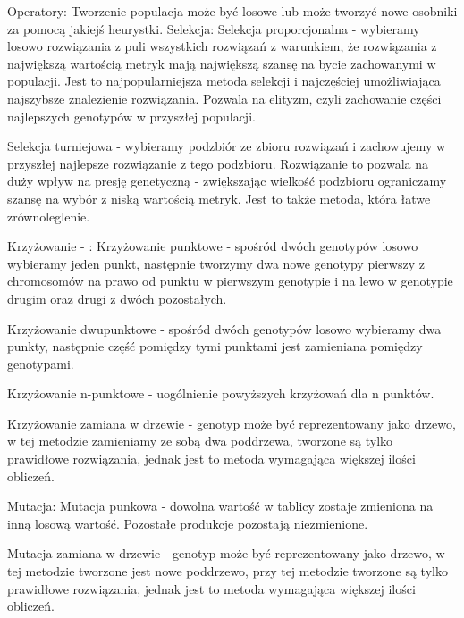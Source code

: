 Operatory:
Tworzenie populacja może być losowe lub może tworzyć nowe osobniki za pomocą jakiejś heurystki. 
Selekcja:
Selekcja proporcjonalna - wybieramy losowo rozwiązania z puli wszystkich rozwiązań z warunkiem, że rozwiązania z największą wartością metryk mają największą szansę na bycie zachowanymi w populacji. Jest to najpopularniejsza metoda selekcji i najczęściej umożliwiająca najszybsze znalezienie rozwiązania. Pozwala na elityzm, czyli zachowanie części najlepszych genotypów w przyszłej populacji.

Selekcja turniejowa - wybieramy podzbiór ze zbioru rozwiązań i zachowujemy w przyszłej najlepsze rozwiązanie z tego podzbioru.
Rozwiązanie to pozwala na duży wpływ na presję genetyczną - zwiększając wielkość podzbioru ograniczamy szansę na wybór z niską wartością metryk.  Jest to także metoda, która łatwe zrównoleglenie.

Krzyżowanie - :
Krzyżowanie punktowe - spośród dwóch genotypów losowo wybieramy jeden punkt, następnie tworzymy dwa nowe genotypy pierwszy z chromosomów na prawo od punktu w pierwszym genotypie i na lewo w genotypie drugim oraz drugi z dwóch pozostałych.

Krzyżowanie dwupunktowe - spośród dwóch genotypów losowo wybieramy dwa punkty, następnie część pomiędzy tymi punktami jest zamieniana pomiędzy genotypami.

Krzyżowanie n-punktowe - uogólnienie powyższych krzyżowań dla n punktów.

Krzyżowanie zamiana w drzewie - genotyp może być reprezentowany jako drzewo, w tej metodzie zamieniamy ze sobą dwa poddrzewa, tworzone są tylko prawidłowe rozwiązania, jednak jest to metoda wymagająca większej ilości obliczeń.  

Mutacja:
Mutacja punkowa - dowolna wartość w tablicy zostaje zmieniona na inną losową wartość. Pozostałe produkcje pozostają niezmienione.

Mutacja zamiana w drzewie - genotyp może być reprezentowany jako drzewo, w tej metodzie tworzone jest nowe poddrzewo, przy tej metodzie tworzone są tylko prawidłowe rozwiązania, jednak jest to metoda wymagająca większej ilości obliczeń. 

